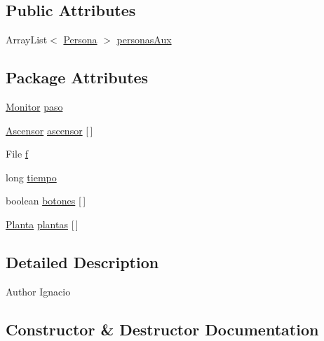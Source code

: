\subsection*{Public Attributes}
\begin{DoxyCompactItemize}
\item 
Array\+List$<$ \mbox{\hyperlink{classpecl6part1_1_1_persona}{Persona}} $>$ \mbox{\hyperlink{classpecl6part1_1_1_controlador_a2326908271d514b5346c7091584c0e92}{personas\+Aux}}
\end{DoxyCompactItemize}
\subsection*{Package Attributes}
\begin{DoxyCompactItemize}
\item 
\mbox{\hyperlink{classpecl6part1_1_1_monitor}{Monitor}} \mbox{\hyperlink{classpecl6part1_1_1_controlador_af51f3a80f264d4175c0381f8b5e8edc0}{paso}}
\item 
\mbox{\hyperlink{classpecl6part1_1_1_ascensor}{Ascensor}} \mbox{\hyperlink{classpecl6part1_1_1_controlador_ab1a946290b47216d355b09da476486db}{ascensor}} \mbox{[}$\,$\mbox{]}
\item 
File \mbox{\hyperlink{classpecl6part1_1_1_controlador_a105bb0bb218c9e351cc76ddcb259a426}{f}}
\item 
long \mbox{\hyperlink{classpecl6part1_1_1_controlador_a2c971f9177446bce4a9d77472fedb100}{tiempo}}
\item 
boolean \mbox{\hyperlink{classpecl6part1_1_1_controlador_a781439598125d105ce83e99dd7ae45eb}{botones}} \mbox{[}$\,$\mbox{]}
\item 
\mbox{\hyperlink{classpecl6part1_1_1_planta}{Planta}} \mbox{\hyperlink{classpecl6part1_1_1_controlador_af8149da8845735945b38d7a29a50e397}{plantas}} \mbox{[}$\,$\mbox{]}
\end{DoxyCompactItemize}


\subsection{Detailed Description}
\begin{DoxyAuthor}{Author}
Ignacio 
\end{DoxyAuthor}


\subsection{Constructor \& Destructor Documentation}
\mbox{\label{classpecl6part1_1_1_controlador_a12360cf104ca852d3823f72282668406}} 
